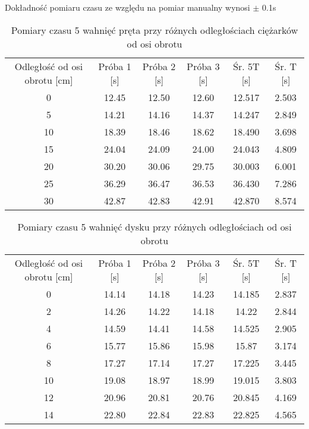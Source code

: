 \documentclass[10pt,a4paper]{article}
\newcommand{\forceindent}{\leavevmode{\parindent=3em\indent}}
\begin{document}
\forceindent Dokładność pomiaru czasu ze względu na pomiar manualny wynosi $\pm$ 0.1s
\vspace{10pt}
\begin{table}[!h]
\centering
\begin{tabular}{|c||c|c|c||c|c|}
\hline
Odległość od osi obrotu [cm]& Próba 1 [s] & Próba 2 [s] & Próba 3 [s] & Śr. 5T [s] & Śr. T [s]\\
\hhline{|=||=|=|=||=|=|}
0 & 12.45 & 12.50 & 12.60 & 12.517 & 2.503\\
5 & 14.21 & 14.16 & 14.37 & 14.247 & 2.849\\ 
10 & 18.39 & 18.46 & 18.62 & 18.490 & 3.698\\
15 & 24.04 & 24.09 & 24.00 & 24.043 & 4.809\\
20 & 30.20 & 30.06 & 29.75 & 30.003 & 6.001\\
25 & 36.29 & 36.47 & 36.53 & 36.430 & 7.286\\
30 & 42.87 & 42.83 & 42.91 & 42.870 & 8.574\\
\hline

\end{tabular}
\caption{Pomiary czasu 5 wahnięć pręta przy różnych odległościach ciężarków od osi obrotu}
\end{table}
\vspace{10pt}


\begin{table}[!h]
\centering
\begin{tabular}{|c||c|c|c||c|c|}
\hline
Odległość od osi obrotu [cm]& Próba 1 [s] & Próba 2 [s] & Próba 3 [s] & Śr. 5T [s] & Śr. T [s]\\
\hhline{|=||=|=|=||=|=|}
0 & 14.14 & 14.18 & 14.23 & 14.185 & 2.837\\
2 & 14.26 & 14.22 & 14.18 & 14.22 & 2.844\\ 
4 & 14.59 & 14.41 & 14.58 & 14.525 & 2.905\\
6 & 15.77 & 15.86 & 15.98 & 15.87 & 3.174\\
8 & 17.27 & 17.14 & 17.27 & 17.225 & 3.445\\
10 & 19.08 & 18.97 & 18.99 & 19.015 & 3.803\\
12 & 20.96 & 20.81 & 20.76 & 20.845 & 4.169\\
14 & 22.80 & 22.84 & 22.83 & 22.825 & 4.565\\
\hline

\end{tabular}
\caption{Pomiary czasu 5 wahnięć dysku przy różnych odległościach od osi obrotu}
\end{table}
\vspace{10pt}
\end{document}
